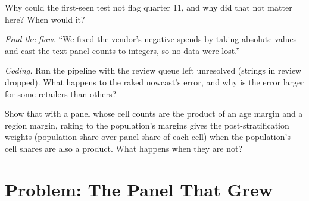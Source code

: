 \begin{exercise}[$\star\star$]\label{exo:ml:alternative-data-pipelines:5}
Why could the first-seen test not flag quarter 11, and why did that not matter here? When would it?
\end{exercise}

\begin{exercise}[$\star\star$]\label{exo:ml:alternative-data-pipelines:6}
\emph{Find the flaw.} ``We fixed the vendor's negative spends by taking absolute values and cast the text panel counts to
integers, so no data were lost.''
\end{exercise}

\begin{exercise}[$\star\star\star$]\label{exo:ml:alternative-data-pipelines:7}
\emph{Coding.} Run the pipeline with the review queue left unresolved (strings in review dropped). What happens to the raked
nowcast's error, and why is the error larger for some retailers than others?
\end{exercise}

\begin{exercise}[$\star\star\star$]\label{exo:ml:alternative-data-pipelines:8}
Show that with a panel whose cell counts are the product of an age margin and a region margin, raking to the population's
margins gives the post-stratification weights (population share over panel share of each cell) when the population's cell
shares are also a product. What happens when they are not?
\end{exercise}

\section{Problem: The Panel That Grew}

